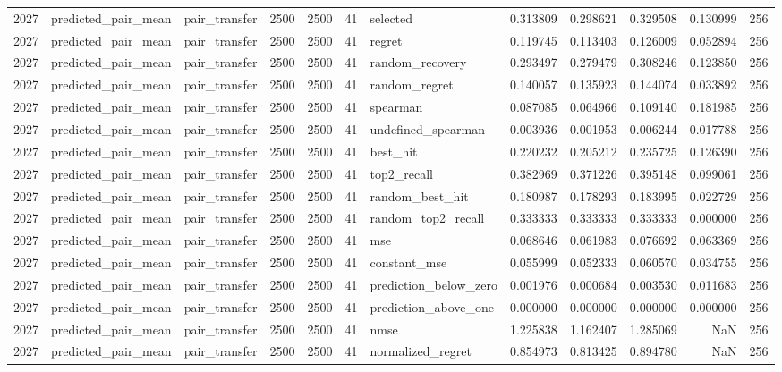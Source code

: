 \begin{tabular}{rllrrrlrrrrr}
2027 & predicted_pair_mean & pair_transfer & 2500 & 2500 & 41 & selected & 0.313809 & 0.298621 & 0.329508 & 0.130999 & 256 \\
2027 & predicted_pair_mean & pair_transfer & 2500 & 2500 & 41 & regret & 0.119745 & 0.113403 & 0.126009 & 0.052894 & 256 \\
2027 & predicted_pair_mean & pair_transfer & 2500 & 2500 & 41 & random_recovery & 0.293497 & 0.279479 & 0.308246 & 0.123850 & 256 \\
2027 & predicted_pair_mean & pair_transfer & 2500 & 2500 & 41 & random_regret & 0.140057 & 0.135923 & 0.144074 & 0.033892 & 256 \\
2027 & predicted_pair_mean & pair_transfer & 2500 & 2500 & 41 & spearman & 0.087085 & 0.064966 & 0.109140 & 0.181985 & 256 \\
2027 & predicted_pair_mean & pair_transfer & 2500 & 2500 & 41 & undefined_spearman & 0.003936 & 0.001953 & 0.006244 & 0.017788 & 256 \\
2027 & predicted_pair_mean & pair_transfer & 2500 & 2500 & 41 & best_hit & 0.220232 & 0.205212 & 0.235725 & 0.126390 & 256 \\
2027 & predicted_pair_mean & pair_transfer & 2500 & 2500 & 41 & top2_recall & 0.382969 & 0.371226 & 0.395148 & 0.099061 & 256 \\
2027 & predicted_pair_mean & pair_transfer & 2500 & 2500 & 41 & random_best_hit & 0.180987 & 0.178293 & 0.183995 & 0.022729 & 256 \\
2027 & predicted_pair_mean & pair_transfer & 2500 & 2500 & 41 & random_top2_recall & 0.333333 & 0.333333 & 0.333333 & 0.000000 & 256 \\
2027 & predicted_pair_mean & pair_transfer & 2500 & 2500 & 41 & mse & 0.068646 & 0.061983 & 0.076692 & 0.063369 & 256 \\
2027 & predicted_pair_mean & pair_transfer & 2500 & 2500 & 41 & constant_mse & 0.055999 & 0.052333 & 0.060570 & 0.034755 & 256 \\
2027 & predicted_pair_mean & pair_transfer & 2500 & 2500 & 41 & prediction_below_zero & 0.001976 & 0.000684 & 0.003530 & 0.011683 & 256 \\
2027 & predicted_pair_mean & pair_transfer & 2500 & 2500 & 41 & prediction_above_one & 0.000000 & 0.000000 & 0.000000 & 0.000000 & 256 \\
2027 & predicted_pair_mean & pair_transfer & 2500 & 2500 & 41 & nmse & 1.225838 & 1.162407 & 1.285069 & NaN & 256 \\
2027 & predicted_pair_mean & pair_transfer & 2500 & 2500 & 41 & normalized_regret & 0.854973 & 0.813425 & 0.894780 & NaN & 256 \\

\end{tabular}
